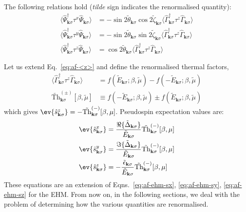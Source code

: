 The following relations hold (\textit{tilde} sign indicates the renormalised quantity):
\[
\begin{aligned}
	\langle \hat \Psi_{\mathbf{k}\sigma}^\dagger \tau^x \hat \Psi_{\mathbf{k}\sigma} \rangle &= -\sin 2\tilde{\theta}_{\mathbf{k}\sigma} \cos 2\tilde{\zeta}_{\mathbf{k}\sigma} \langle \hat \Gamma_{\mathbf{k}\sigma}^\dagger \tau^z \hat \Gamma_{\mathbf{k}\sigma} \rangle \\
	\langle \hat \Psi_{\mathbf{k}\sigma}^\dagger \tau^y \hat \Psi_{\mathbf{k}\sigma} \rangle &= -\sin 2\tilde{\theta}_{\mathbf{k}\sigma} \sin 2\tilde{\zeta}_{\mathbf{k}\sigma} \langle \hat \Gamma_{\mathbf{k}\sigma}^\dagger \tau^z \hat \Gamma_{\mathbf{k}\sigma} \rangle \\
	\langle \hat \Psi_{\mathbf{k}\sigma}^\dagger \tau^z \hat \Psi_{\mathbf{k}\sigma} \rangle &= \cos 2\tilde{\theta}_{\mathbf{k}\sigma} \langle \hat \Gamma_{\mathbf{k}\sigma}^\dagger \tau^z \hat \Gamma_{\mathbf{k}\sigma} \rangle
\end{aligned}
\]

Let us extend Eq.~\eqref{eq:af-<z>} and define the renormalised thermal factors,
\begin{align}
	\langle \hat \Gamma_{\mathbf{k}\sigma}^\dagger \tau^z \hat \Gamma_{\mathbf{k}\sigma} \rangle &=
	f\left(
	\tilde{E}_{\mathbf{k}\sigma};\beta,\tilde{\mu}
	\right) - f\left(
	-\tilde{E}_{\mathbf{k}\sigma};\beta,\tilde{\mu}
	\right) \label{eq:af-<~z>}\\
	\tilde{\mathrm{Th}}_{\mathbf{k}\sigma}^{(\pm)}[\beta,\tilde{\mu}] &\equiv 
	f\left(
	-\tilde{E}_{\mathbf{k}\sigma};\beta,\tilde{\mu}
	\right) \pm f\left(
	\tilde{E}_{\mathbf{k}\sigma};\beta,\tilde{\mu}
	\right) \label{eq:af-~Th}
\end{align}
which gives $\ev{\hat s_{\mathbf{k}\sigma}^z} = -\tilde{\mathrm{Th}}_{\mathbf{k}\sigma}^{(-)}[\beta,\mu]$. Pseudospin expectation values are:
\begin{align}
	\ev{\hat s_{\mathbf{k}\sigma}^x} &= \frac{\Re \lbrace \tilde{\Delta}_{\mathbf{k}\sigma} \rbrace}{\tilde{E}_{\mathbf{k}\sigma}} \tilde{\mathrm{Th}}_{\mathbf{k}\sigma}^{(-)}[\beta,\mu] \label{eq:af-ehm-sx} \\
	\ev{\hat s_{\mathbf{k}\sigma}^y} &= \frac{\Im \lbrace \tilde{\Delta}_{\mathbf{k}\sigma} \rbrace}{\tilde{E}_{\mathbf{k}\sigma}} \tilde{\mathrm{Th}}_{\mathbf{k}\sigma}^{(-)}[\beta,\mu] \label{eq:af-ehm-sy}\\
	\ev{\hat s_{\mathbf{k}\sigma}^z} &=  -\frac{\tilde{\epsilon}_{\mathbf{k}\sigma}}{\tilde{E}_{\mathbf{k}\sigma}}  \tilde{\mathrm{Th}}_{\mathbf{k}\sigma}^{(-)}[\beta,\mu] \label{eq:af-ehm-sz}
\end{align}
These equations are an extension of Eqns.~\eqref{eq:af-ehm-sx}, \eqref{eq:af-ehm-sy}, \eqref{eq:af-ehm-sz} for the EHM. From now on, in the following sections, we deal with the problem of determining how the various quantities are renormalised.

